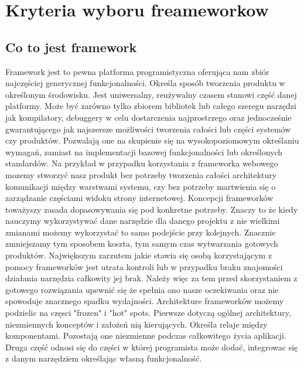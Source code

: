 \documentclass[12pt]{report}
\begin{document}
\chapter{Kryteria wyboru freameworkow}

  \section{Co to jest framework}
    Framework jest to pewna platforma programistyczna oferująca nam zbiór najczęściej generycznej funkcjonalności.
    Określa sposób tworzenia produktu w określonym środowisku.
    Jest uniwersalny, reużywalny czasem stanowi część danej platformy.
    Może być zarówno tylko zbiorem bibliotek lub całego szeregu narzędzi jak kompilatory, debuggery w celu dostarczenia najprostrzego oraz jednocześnie gwarantującego jak najszersze możliwości tworzenia całości lub części systemów czy produktów.
    Pozwalają one na skupienie się na wysokopoziomowym określaniu wymagań, zamiast na implementacji bazowej funkcjonalności lub określonych standardów. 
    Na przykład w przypadku korzystania z frameworka webowego mozemy stworzyć nasz produkt bez potrzeby tworzenia całości architektury komunikacji między warstwami systemu, czy bez potrzeby martwienia się o zarządzanie częściami widoku strony internetowej.
    Koncepcji frameworków toważyszy zasada dopasowywania się pod konkretne potrzeby.
    Znaczy to że kiedy nauczymy wykorzystywać dane narzędzie dla danego projektu z nie wielkimi zmianami możemy wykorzystać to samo podejście przy kolejnych.
    Znacznie zmniejszamy tym sposobem koszta, tym samym czas wytwarzania gotowych produktów.
    Największym zarzutem jakie stawia się osobą korzystającym z pomocy frameworków jest utrata kontroli lub w przypadku braku znajomości działania narzędzia całkowity jej brak.
    Należy więc za tem przed skorzystaniem z gotowego rozwiązania upewnić się że spełnia ono nasze oczekiwania oraz nie spowoduje znacznego spadku wydajności.
    Architekture frameworków możemy podzielic na częsci "frozen" i "hot" spots.
    Pierwsze dotyczą ogólnej architektury, niezmiennych konceptów i założeń nią kierujących.
    Określa relaje między komponentami.
    Pozostają one niezmienne podczas całkowitego życia aplikacji.
    Druga część odnosi się do części w której programista może dodać, integrowac się z danym narzędziem określając własną funkcjonalność.
\end{document}
